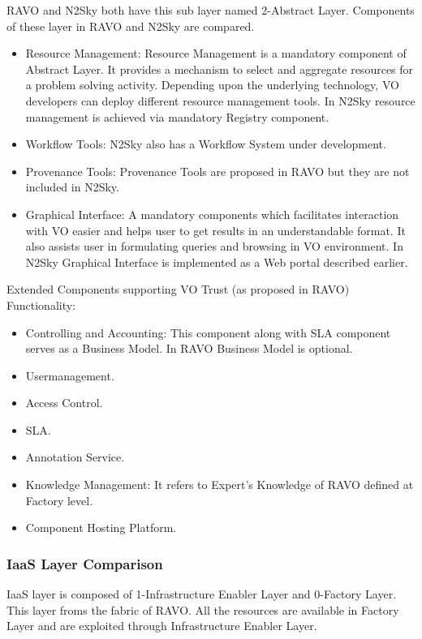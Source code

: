 \documentclass[]{article}
\begin{document}
 RAVO and N2Sky both have this sub layer named 2-Abstract Layer. Components of these layer in RAVO and N2Sky are compared.
\begin{itemize}
\item Resource Management: Resource Management is a mandatory component of Abstract Layer. It provides a mechanism to select and aggregate resources for a problem solving activity. Depending upon the underlying technology, VO developers can deploy different resource management tools. In N2Sky resource management is achieved via mandatory Registry component.

\item Workflow Tools: N2Sky also has a Workflow System under development.

\item Provenance Tools: Provenance Tools are proposed in RAVO but they are not included in N2Sky.
\item Graphical Interface: A mandatory components which facilitates interaction with VO easier and helps user to get results in an understandable format. It also assists user in formulating queries and browsing in VO environment. In N2Sky Graphical Interface is implemented as a Web portal described earlier.
\end{itemize}

  Extended Components supporting VO Trust (as proposed in RAVO) Functionality:
  \begin{itemize}
  \item Controlling and Accounting: This component along with SLA component serves as a Business Model. In RAVO Business Model is optional.
  \item Usermanagement.
  \item Access Control.
  \item SLA.
  \item Annotation Service.
  \item Knowledge Management: It refers to Expert's Knowledge of RAVO defined at Factory level.
  \item Component Hosting Platform.
  \end{itemize}


\subsubsection{IaaS Layer Comparison}
IaaS layer is composed of 1-Infrastructure Enabler Layer and 0-Factory Layer. This layer froms the fabric of RAVO. All the resources are available in Factory Layer and are exploited through Infrastructure Enabler Layer.
\end{document}

